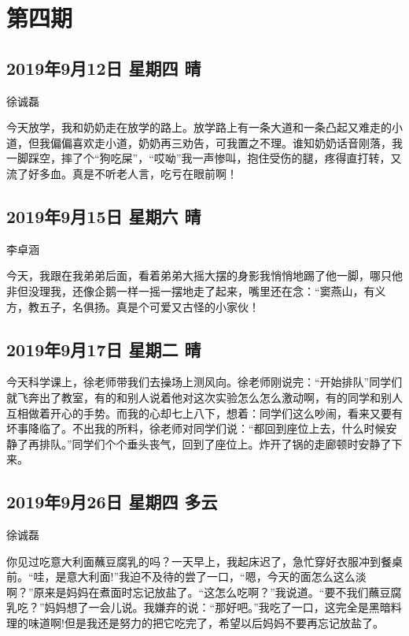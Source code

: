 \chapter{第四期}

\section{2019年9月12日 星期四 晴}

徐诚磊

今天放学，我和奶奶走在放学的路上。放学路上有一条大道和一条凸起又难走的小道，但我偏偏喜欢走小道，奶奶再三劝告，可我置之不理。谁知奶奶话音刚落，我一脚踩空，摔了个``狗吃屎''，``哎呦''我一声惨叫，抱住受伤的腿，疼得直打转，又流了好多血。真是不听老人言，吃亏在眼前啊！

\section{2019年9月15日 星期六 晴}

李卓涵

今天，我跟在我弟弟后面，看着弟弟大摇大摆的身影我悄悄地踢了他一脚，哪只他非但没理我，还像企鹅一样一摇一摆地走了起来，嘴里还在念：``窦燕山，有义方，教五子，名俱扬。真是个可爱又古怪的小家伙！

\section{2019年9月17日 星期二 晴}

今天科学课上，徐老师带我们去操场上测风向。徐老师刚说完：``开始排队''同学们就飞奔出了教室，有的和别人说着他对这次实验怎么怎么激动啊，有的同学和别人互相做着开心的手势。而我的心却七上八下，想着：同学们这么吵闹，看来又要有坏事降临了。不出我的所料，徐老师对同学们说：``都回到座位上去，什么时候安静了再排队。''同学们个个垂头丧气，回到了座位上。炸开了锅的走廊顿时安静了下来。

\section{2019年9月26日 星期四 多云}

徐诚磊

你见过吃意大利面蘸豆腐乳的吗？一天早上，我起床迟了，急忙穿好衣服冲到餐桌前。``哇，是意大利面!''我迫不及待的尝了一口，``嗯，今天的面怎么这么淡啊？''原来是妈妈在煮面时忘记放盐了。``这怎么吃啊？''我说道。``要不我们蘸豆腐乳吃？''妈妈想了一会儿说。我嫌弃的说：``那好吧。''我吃了一口，这完全是黑暗料理的味道啊!但是我还是努力的把它吃完了，希望以后妈妈不要再忘记放盐了。

